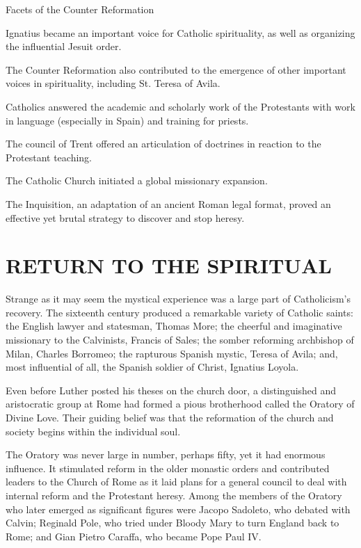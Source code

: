 \begin{sidebar}{Facets of the Counter Reformation}
\begin{numlist}
\item[1.] Ignatius became an important voice for Catholic spirituality, as well as organizing the
  influential Jesuit order.
\item[2.] The Counter Reformation also contributed to the emergence of other important voices in
  spirituality, including St. Teresa of Avila.
\item[3.] Catholics answered the academic and scholarly work of the Protestants with work in
  language (especially in Spain) and training for priests.
\item[4.] The council of Trent offered an articulation of doctrines in reaction to the Protestant
  teaching.
\item[5.] The Catholic Church initiated a global missionary expansion.
\item[6.] The Inquisition, an adaptation of an ancient Roman legal format, proved an effective yet
  brutal strategy to discover and stop heresy.
\end{numlist}
\end{sidebar}

\section{RETURN TO THE SPIRITUAL}

Strange as it may seem the mystical experience was a large part of Catholicism’s recovery. The
sixteenth century produced a remarkable variety of Catholic saints: the English lawyer and
statesman, Thomas More; the cheerful and imaginative missionary to the Calvinists, Francis of Sales;
the somber reforming archbishop of Milan, Charles Borromeo; the rapturous Spanish mystic, Teresa of
Avila; and, most influential of all, the Spanish soldier of Christ, Ignatius Loyola.

Even before Luther posted his theses on the church door, a distinguished and aristocratic group at
Rome had formed a pious brotherhood called the Oratory of Divine Love. Their guiding belief was that
the reformation of the church and society begins within the individual soul.

The Oratory was never large in number, perhaps fifty, yet it had enormous influence. It stimulated
reform in the older monastic orders and contributed leaders to the Church of Rome as it laid plans
for a general council to deal with internal reform and the Protestant heresy. Among the members of
the Oratory who later emerged as significant figures were Jacopo Sadoleto, who debated with Calvin;
Reginald Pole, who tried under Bloody Mary to turn England back to Rome; and Gian Pietro Caraffa,
who became Pope Paul IV.

